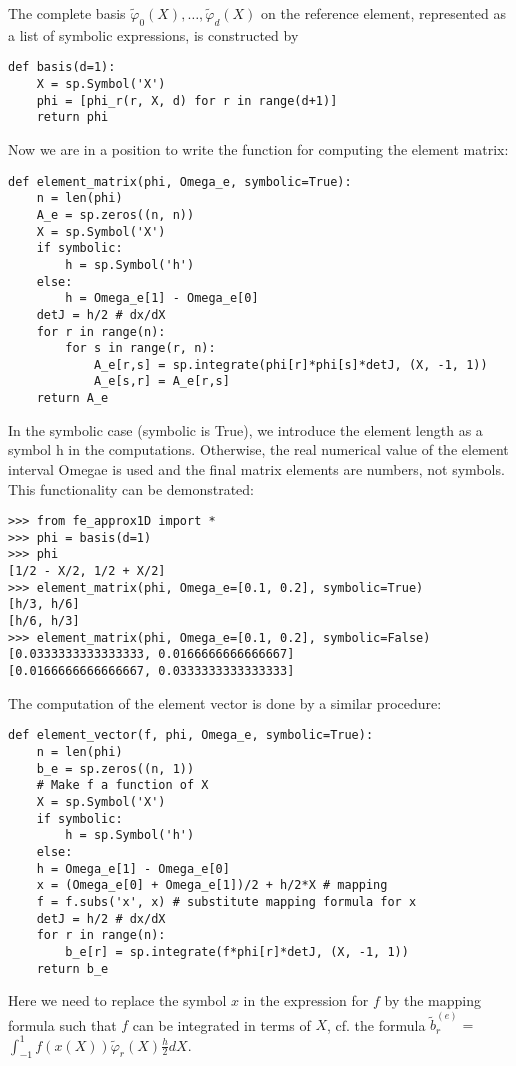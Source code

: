 \documentclass[../main.tex]{subfiles}
\begin{document}
The complete basis $\tilde{\varphi}_{0}(X), \ldots, \tilde{\varphi}_{d}(X)$ on the reference element, represented as a list of symbolic expressions, is constructed by
\begin{lstlisting}[numbers=none]
def basis(d=1):
	X = sp.Symbol('X')
	phi = [phi_r(r, X, d) for r in range(d+1)]
	return phi	
\end{lstlisting}
Now we are in a position to write the function for computing the element matrix:
\begin{lstlisting}[numbers=none]
def element_matrix(phi, Omega_e, symbolic=True):
	n = len(phi)
	A_e = sp.zeros((n, n))
	X = sp.Symbol('X')
	if symbolic:
		h = sp.Symbol('h')
	else:
		h = Omega_e[1] - Omega_e[0]
	detJ = h/2 # dx/dX
	for r in range(n):
		for s in range(r, n):
			A_e[r,s] = sp.integrate(phi[r]*phi[s]*detJ, (X, -1, 1))
			A_e[s,r] = A_e[r,s]
	return A_e	
\end{lstlisting}
In the symbolic case (symbolic is True), we introduce the element length as
a symbol h in the computations. Otherwise, the real numerical value of the element interval Omega\textunderscore e is used and the final matrix elements are numbers, not
symbols. This functionality can be demonstrated:
\begin{lstlisting}[numbers=none]
>>> from fe_approx1D import *
>>> phi = basis(d=1)
>>> phi
[1/2 - X/2, 1/2 + X/2]
>>> element_matrix(phi, Omega_e=[0.1, 0.2], symbolic=True)
[h/3, h/6]
[h/6, h/3]
>>> element_matrix(phi, Omega_e=[0.1, 0.2], symbolic=False)
[0.0333333333333333, 0.0166666666666667]
[0.0166666666666667, 0.0333333333333333]	
\end{lstlisting}
The computation of the element vector is done by a similar procedure:
\begin{lstlisting}[numbers=none]
def element_vector(f, phi, Omega_e, symbolic=True):
	n = len(phi)
	b_e = sp.zeros((n, 1))
	# Make f a function of X
	X = sp.Symbol('X')
	if symbolic:
		h = sp.Symbol('h')
	else:
	h = Omega_e[1] - Omega_e[0]
	x = (Omega_e[0] + Omega_e[1])/2 + h/2*X # mapping
	f = f.subs('x', x) # substitute mapping formula for x
	detJ = h/2 # dx/dX
	for r in range(n):
		b_e[r] = sp.integrate(f*phi[r]*detJ, (X, -1, 1))
	return b_e	
\end{lstlisting}
Here we need to replace the symbol $x$ in the expression for $f$ by the mapping formula such that $f$ can be integrated in terms of $X$, cf. the formula $\tilde{b}_{r}^{(e)}=$ $\int_{-1}^{1} f(x(X)) \tilde{\varphi}_{r}(X) \frac{h}{2} d X$.
\end{document}
